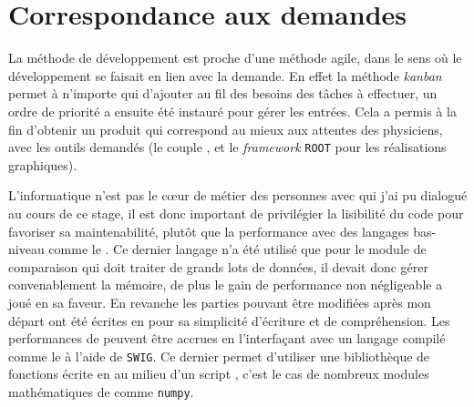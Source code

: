 \section{Correspondance aux demandes}

La méthode de développement est proche d'une méthode agile, dans le sens où le développement se faisait en lien avec la demande. En effet la méthode \emph{kanban} permet à n'importe qui d'ajouter au fil des besoins des tâches à effectuer, un ordre de priorité a ensuite été instauré pour gérer les entrées. Cela a permis à la fin d'obtenir un produit qui correspond au mieux aux attentes des physiciens, avec les outils demandés (le couple \Python{}, \Cpp{} et le \emph{framework} \texttt{ROOT} pour les réalisations graphiques).

L'informatique n'est pas le c\oe{}ur de métier des personnes avec qui j'ai pu dialogué au cours de ce stage, il est donc important de privilégier la lisibilité du code pour favoriser sa maintenabilité, plutôt que la performance avec des langages bas-niveau comme le \Cpp{}. Ce dernier langage n'a été utilisé que pour le module de comparaison qui doit traiter de grands lots de données, il devait donc gérer convenablement la mémoire, de plus le gain de performance non négligeable a joué en sa faveur. En revanche les parties pouvant être modifiées après mon départ ont été écrites en \Python{} pour sa simplicité d'écriture et de compréhension. Les performances de \Python{} peuvent être accrues en l'interfaçant avec un langage compilé comme le \Cpp{} à l'aide de \texttt{SWIG}. Ce dernier permet d'utiliser une bibliothèque de fonctions écrite en \Cpp{} au milieu d'un script \Python{}, c'est le cas de nombreux modules mathématiques de \Python{} comme \texttt{numpy}.

\ 


